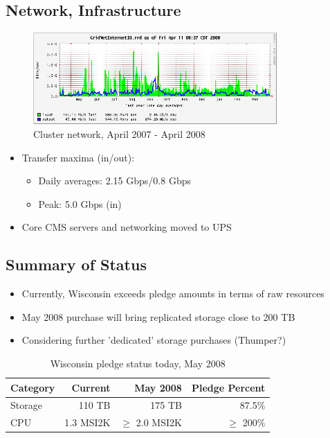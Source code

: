 \documentclass{beamer}
\begin{document}
\subsection{Network, Infrastructure}
\begin{frame}
\begin{figure}
    \includegraphics[height=3.5cm]{Graphics/gridnetio-1year.png}
    \caption{Cluster network, April 2007 - April 2008}
\end{figure}

\begin{itemize}
    \item Transfer maxima (in/out):
    \begin{itemize}
        \item Daily averages: 2.15 Gbps/0.8 Gbps
        \item Peak: 5.0 Gbps (in)
    \end{itemize}
    \item Core CMS servers and networking moved to UPS
\end{itemize}
\end{frame}

\subsection{Summary of Status}
\begin{frame}
\begin{itemize}
    \item Currently, Wisconsin exceeds pledge amounts in terms of raw resources
    \item May 2008 purchase will bring replicated storage close to 200 TB
    \item Considering further 'dedicated' storage purchases (Thumper?)
\end{itemize}
\begin{table}
     \begin{tabular}{lrrr}
         \toprule
         Category    & Current       & May 2008      & Pledge Percent \\
         \midrule
         Storage     & 110 TB        & 175 TB        & 87.5\%\footnotemark[1] \\
         CPU         & 1.3 MSI2K     & $\geq$ 2.0 MSI2K & $\geq$ 200\% \\
         \bottomrule
     \end{tabular}
     \caption{Wisconsin pledge status today, May 2008}
\end{table}

\end{frame}
\end{document}
